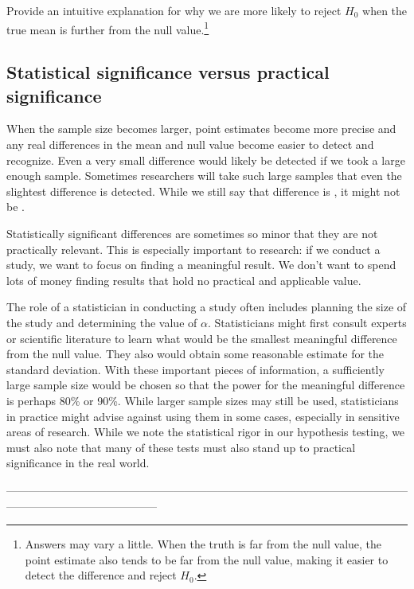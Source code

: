 \begin{exercise}
Provide an intuitive explanation for why we are more likely to reject $H_0$ when the true mean is further from the null value.\footnote{Answers may vary a little. When the truth is far from the null value, the point estimate also tends to be far from the null value, making it easier to detect the difference and reject $H_0$.}
\end{exercise}

\subsection{Statistical significance versus practical significance}

When the sample size becomes larger, point estimates become more precise and any real differences in the mean and null value become easier to detect and recognize. Even a very small difference would likely be detected if we took a large enough sample. Sometimes researchers will take such large samples that even the slightest difference is detected. While we still say that difference is , it might not be .

Statistically significant differences are sometimes so minor that they are not practically relevant. This is especially important to research: if we conduct a study, we want to focus on finding a meaningful result. We don't want to spend lots of money finding results that hold no practical and applicable value.

The role of a statistician in conducting a study often includes planning the size of the study and determining the value of $\alpha$. Statisticians might first consult experts or scientific literature to learn what would be the smallest meaningful difference from the null value. They also would obtain some reasonable estimate for the standard deviation. With these important pieces of information, a sufficiently large sample size would be chosen so that the power for the meaningful difference is perhaps 80\% or 90\%. While larger sample sizes may still be used, statisticians in practice might advise against using them in some cases, especially in sensitive areas of research. While we note the statistical rigor in our hypothesis testing, we must also note that many of these tests must also stand up to practical significance in the real world.









-----------------------------------------------------------------------------------------------------------------------------------------------------
